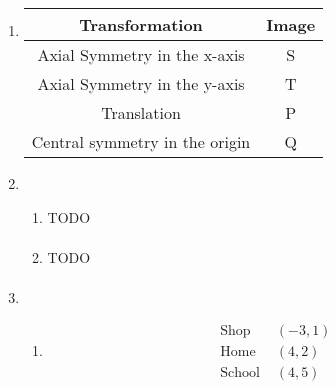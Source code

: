 \documentclass[11pt]{article}
\begin{document}
\begin{enumerate}
    \pagebreak
    \item
        \begin{center}
            \begin{tabular}{|c|c|} 
                \hline
                Transformation&Image\\
                \hline
                Axial Symmetry in the x-axis&S\\
                Axial Symmetry in the y-axis&T\\
                Translation&P\\
                Central symmetry in the origin&Q\\
                \hline
            \end{tabular}
        \end{center}
            

    \pagebreak
    \item
        \begin{enumerate}
            \item TODO
            \begin{equation*}
                \begin{split}
                \end{split}
            \end{equation*}
            
            \item TODO
            \begin{equation*}
                \begin{split}
                \end{split}
            \end{equation*}
        \end{enumerate}

    \pagebreak
    \item
        \begin{enumerate}
            \item 
            \begin{equation*}
                \begin{split}
                    \text{Shop }&(-3, 1)\\
                    \text{Home }&(4, 2)\\
                    \text{School }&(4, 5)
                \end{split}
            \end{equation*}
            

\end{enumerate}
\end{enumerate}
\end{document}
